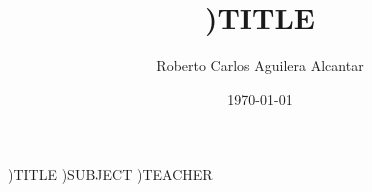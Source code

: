 \documentclass[12pt, letterpaper]{article}
\title{)TITLE}
\author{Roberto Carlos Aguilera Alcantar}
\date{\today}
\begin{document}

\mytitlepage
{)TITLE} %
{)SUBJECT} %
{)TEACHER} %

\end{document}
